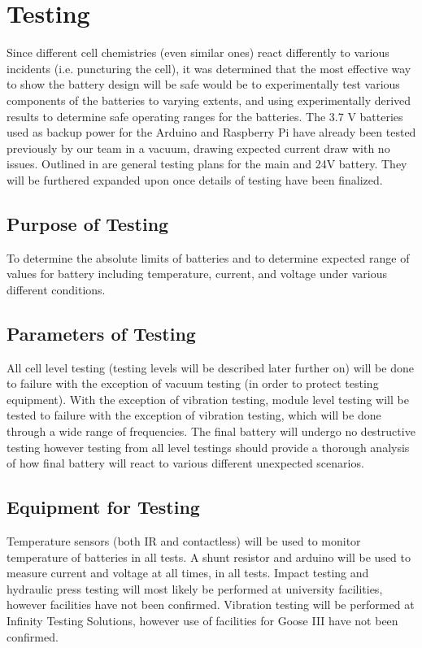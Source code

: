 \documentclass[main.tex]{subfiles}
\begin{document}
    \section{Testing}
    Since different cell chemistries (even similar ones) react differently to various incidents (i.e. puncturing the cell), it was determined that the most effective way to show the battery design will be safe would be to experimentally test various components of the batteries to varying  extents, and using experimentally derived results to determine safe operating ranges for the batteries. The 3.7 V batteries used as backup power for the Arduino and Raspberry Pi have already been tested previously by our team in a vacuum, drawing expected current draw with no issues. Outlined in  are general testing plans for the main and 24V battery. They will be furthered expanded upon once details of testing have been finalized.
    \subsection{Purpose of Testing}
    To determine the absolute limits of batteries and to determine expected range of values for battery including temperature, current, and voltage under various different conditions.
    \subsection{Parameters of Testing}
    All cell level testing (testing levels will be described later further on) will be done to failure with the exception of vacuum testing (in order to protect testing equipment). With the exception of vibration testing, module level testing will be tested to failure with the exception of vibration testing, which will be done through a wide range of frequencies. The final battery will undergo no destructive testing however testing from all level testings should provide a thorough analysis of how final battery will react to various different unexpected scenarios.
    \subsection{Equipment for Testing}
    Temperature sensors (both IR and contactless) will be used to monitor temperature of batteries in all tests. A shunt resistor and arduino will be used to measure current and voltage at all times, in all tests. Impact testing and hydraulic press testing will most likely be performed at university facilities, however facilities have not been confirmed. Vibration testing will be performed at Infinity Testing Solutions, however use of facilities for Goose III have not been confirmed.
\end{document}

